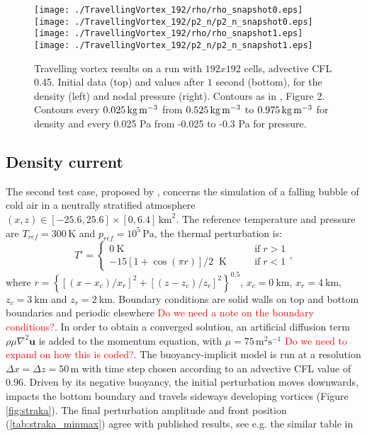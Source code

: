 \documentclass{ametsoc}
\theoremstyle{definition}
\newcommand{\benacchio}[1]{\textcolor{red}{#1}}
\begin{document}
\begin{figure}
\centering
 \texttt{[image: ./TravellingVortex\_192/rho/rho\_snapshot0.eps]}\texttt{[image: ./TravellingVortex\_192/p2\_n/p2\_n\_snapshot0.eps]}\\
 \texttt{[image: ./TravellingVortex\_192/rho/rho\_snapshot1.eps]}
 \texttt{[image: ./TravellingVortex\_192/p2\_n/p2\_n\_snapshot1.eps]}
 \caption{Travelling vortex results on a run with $192x192$ cells, advective CFL 0.45. Initial data (top) and values after $1$ second (bottom), for the density (left) and nodal pressure (right). Contours as in \cite{Benacchio2014}, Figure 2.  Contours every $0.025\,\textrm{kg\,m$^{-3}$}$
 from $0.525\,\textrm{kg\,m$^{-3}$}$ to $0.975\,\textrm{kg\,m$^{-3}$}$ for density and every 0.025 Pa from
-0.025 to -0.3 Pa for pressure.}
 \label{fig:trav_vortex_res}
\end{figure}

\subsection{Density current}

The second test case, proposed by \cite{StrakaEtAl1993}, concerns the simulation of a falling bubble of cold air in a neutrally stratified atmosphere $(x,z)\in[-25.6,25.6]\times[0,6.4]\,\textrm{km}^2$. The reference temperature and pressure  are $T_{ref}=300\,\textrm{K}$ and $p_{ref}=10^5\,\textrm{Pa}$, the thermal perturbation is:
%
\begin{equation}
 T'=\begin{cases}
           0~\textrm{K} \qquad&\textrm{if}\;r>1\\
	   -15\left[1+\cos(\pi r)\right]/2 \;\;\textrm{K}\qquad&\textrm{if}\;r<1   
          \end{cases},
\end{equation} 
%
where $r=\left\{[(x-x_c)/x_r]^2+[(z-z_c)/z_r]^2\right\}^{0.5}$, $x_c=0~\textrm{km}$, $x_r=4~\textrm{km}$, $z_c=3~\textrm{km}$ and $z_r=2~\textrm{km}$. 
%
Boundary conditions are solid walls on top and bottom boundaries and periodic elsewhere \benacchio{Do we need a note on the boundary conditions?}. In order to obtain a converged solution, an artificial diffusion term $\rho\mu\nabla^2\mathbf{u}$ is added to the momentum equation, with $\mu=75\,\textrm{m$^2$s$^{-1}$}$ \benacchio{Do we need to expand on how this is coded?}. The buoyancy-implicit model is run at a resolution $\Delta x=\Delta z=50\,\textrm{m}$ with time step chosen according to an advective CFL value of $0.96$. Driven by its negative buoyancy, the initial perturbation moves downwards, impacts the bottom boundary and travels sideways developing vortices (Figure \ref{fig:straka}). The final perturbation amplitude and front position (\ref{tab:straka_minmax}) agree with published results, see e.g. the similar table in \cite{MelvinEtAl2018} 
\end{document}
